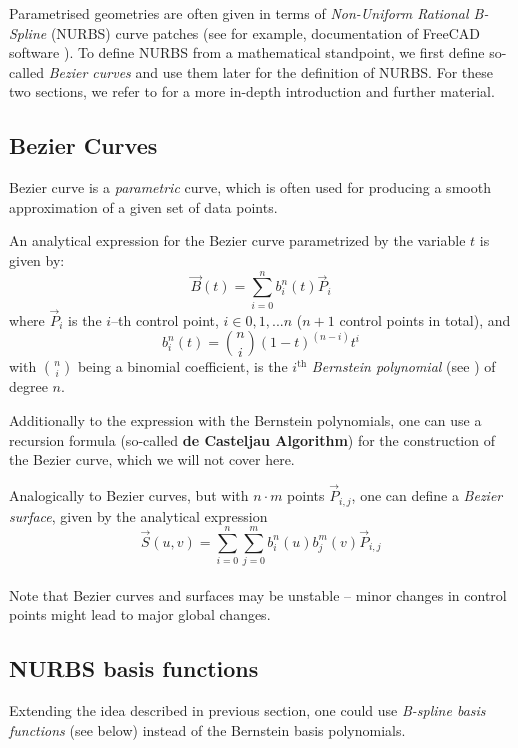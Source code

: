 Parametrised geometries are often given in terms of \emph{Non-Uniform Rational B-Spline} (NURBS) curve patches (see for example, documentation of FreeCAD software \cite{FreeCAD}). 
To define NURBS from a mathematical standpoint, we first define so-called \emph{Bezier curves} and use them later for the definition of NURBS. For these two sections, we refer to \cite{farin2002handbook} for a more in-depth introduction and further material. 
\subsection{Bezier Curves}
Bezier curve is a \textit{parametric} curve, which is often used for producing a smooth approximation of a given set of data points.
 
An analytical expression for the Bezier curve parametrized by the variable $t$ is given by:
\begin{equation*}
\vec{B}(t)=\sum\limits_{i=0}^n b_i^n(t) \vec{P}_i
\end{equation*}
where $\vec{P}_i$ is the $i$--th control point, $i\in0,1,...n$ ($n+1$ control points in total), and
\begin{equation*}
b_i^n(t)=\binom{n}{i}(1-t)^{(n-i)}t^i
\end{equation*}
with $\binom{n}{i}$ being a binomial coefficient, is the $i^{\text{th}}$ \emph{Bernstein polynomial} (see \cite{lorentz2012bernstein}) of degree $n$.

Additionally to the expression with the Bernstein polynomials, one can use a recursion formula (so-called \textbf{de Casteljau Algorithm}) for the construction of the Bezier curve, which we will not cover here.

Analogically to Bezier curves, but with $n\cdot m$ points $\vec{P}_{i,j}$,
one can define a \textit{Bezier surface}, given by the analytical expression
\begin{equation*}
\vec{S}(u,v)=\sum\limits_{i=0}^n \sum\limits_{j=0}^m b_i^n(u) b_j^m(v) \vec{P}_{i,j}
\end{equation*}
\\
Note that Bezier curves and surfaces may be unstable -- minor changes in control points might lead to major global changes.


\subsection{NURBS basis functions}
Extending the idea described in previous section, one could use \emph{B-spline basis functions} (see below) instead of the Bernstein basis polynomials.

